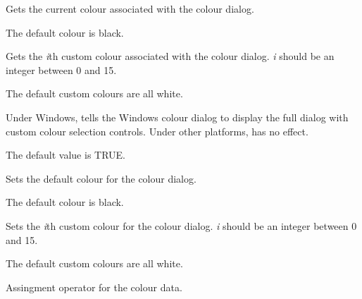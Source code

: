 \label{wxcolourdatagetcolour}


Gets the current colour associated with the colour dialog.

The default colour is black.

\label{wxcolourdatagetcustomcolour}


Gets the {\it i}th custom colour associated with the colour dialog. {\it i} should
be an integer between 0 and 15.

The default custom colours are all white.

\label{wxcolourdatasetchoosefull}


Under Windows, tells the Windows colour dialog to display the full dialog
with custom colour selection controls. Under other platforms, has no effect.

The default value is TRUE.

\label{wxcolourdatasetcolour}


Sets the default colour for the colour dialog.

The default colour is black.

\label{wxcolourdatasetcustomcolour}


Sets the {\it i}th custom colour for the colour dialog. {\it i} should
be an integer between 0 and 15.

The default custom colours are all white.

\label{wxcolourdataassign}


Assingment operator for the colour data.

\section{}\label{wxcolourdatabase}

